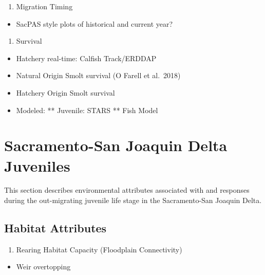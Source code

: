 \documentclass[
]{book}
\providecommand{\tightlist}{%
  \setlength{\itemsep}{0pt}\setlength{\parskip}{0pt}}
\theoremstyle{definition}
\theoremstyle{definition}
\theoremstyle{definition}
\theoremstyle{definition}
\theoremstyle{remark}
\begin{document}
\begin{enumerate}
\def\labelenumi{\arabic{enumi}.}
\setcounter{enumi}{2}
\tightlist
\item
  Migration Timing
\end{enumerate}

\begin{itemize}
\tightlist
\item
  SacPAS style plots of historical and current year?
\end{itemize}

\begin{enumerate}
\def\labelenumi{\arabic{enumi}.}
\setcounter{enumi}{3}
\tightlist
\item
  Survival
\end{enumerate}

\begin{itemize}
\tightlist
\item
  Hatchery real-time: Calfish Track/ERDDAP
\item
  Natural Origin Smolt survival (O Farell et al.~2018)
\item
  Hatchery Origin Smolt survival
\item
  Modeled:
  ** Juvenile: STARS
  ** Fish Model
\end{itemize}

\hypertarget{sacramento-san-joaquin-delta-juveniles}{%
\chapter{Sacramento-San Joaquin Delta Juveniles}\label{sacramento-san-joaquin-delta-juveniles}}

This section describes environmental attributes associated with and responses during the out-migrating juvenile life stage in the Sacramento-San Joaquin Delta.

\hypertarget{habitat-attributes-4}{%
\section{Habitat Attributes}\label{habitat-attributes-4}}

\begin{enumerate}
\def\labelenumi{\arabic{enumi}.}
\tightlist
\item
  Rearing Habitat Capacity (Floodplain Connectivity)
\end{enumerate}

\begin{itemize}
\tightlist
\item
  Weir overtopping
\end{itemize}
\end{document}
